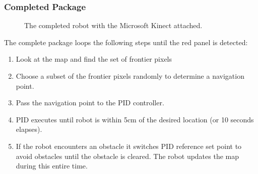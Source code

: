 \documentclass[aspectratio=169]{beamer}
\begin{document}
\begin{frame}
\frametitle{Completed Package}
\begin{minipage}{0.45\textwidth}
\begin{figure}
\centering
{}
\caption{The completed robot with the Microsoft Kinect attached.}
\end{figure}
\end{minipage}
\hspace{0.25cm}
\begin{minipage}{0.45\textwidth}
\footnotesize The complete package loops the following steps until the red panel is detected:
\begin{enumerate}
\item Look at the map and find the set of frontier pixels
\vspace{0.1cm}
\item Choose a subset of the frontier pixels randomly to determine a navigation point.
\vspace{0.1cm}
\item Pass the navigation point to the PID controller.
\vspace{0.1cm}
\item PID executes until robot is within 5cm of the desired location (or 10 seconds elapses).
\item If the robot encounters an obstacle it switches PID reference set point to avoid obstacles until the obstacle is cleared. The robot updates the map during this entire time.
\end{enumerate}
\end{minipage}
\end{frame}

\end{document}
